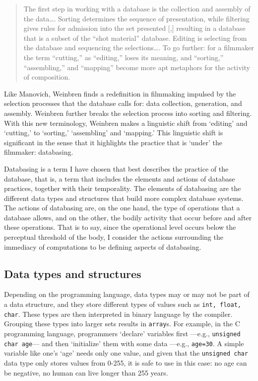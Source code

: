 \begin{quote}
	The first step in working with a database is the collection and assembly of the data\dots. Sorting determines the sequence of presentation, while filtering gives rules for admission into the set presented [,] resulting in a database that is a subset of the ``shot material'' database. Editing is selecting from the database and sequencing the selections\dots. To go further: for a filmmaker the term ``cutting,'' as ``editing,'' loses its meaning, and ``sorting,'' ``assembling,'' and ``mapping'' become more apt metaphors for the activity of composition. \parencite[71]{Wei07:Oce}
\end{quote}

Like Manovich, Weinbren finds a redefinition in filmmaking impulsed by the selection processes that the database calls for: data collection, generation, and assembly. Weinbren further breaks the selection process into sorting and filtering. With this new terminology, Weinbren makes a linguistic shift from `editing' and `cutting,' to `sorting,' `assembling' and `mapping.' This linguistic shift is significant in the sense that it highlights the practice that is `under' the filmmaker: databasing. 

Databasing is a term I have chosen that best describes the practice of the database, that is, a term that includes the elements and actions of database practices, together with their temporality. The elements of databasing are the different data types and structures that build more complex database systems. The actions of databasing are, on the one hand, the type of operations that a database allows, and on the other, the bodily activity that occur before and after these operations. That is to say, since the operational level occurs below the perceptual threshold of the body, I consider the actions surrounding the immediacy of computations to be defining aspects of databasing.

\subsection{Data types and structures}

Depending on the programming language, data types may or may not be part of a data structure, and they store different types of values such as \texttt{int, float, char}. These types are then interpreted in binary language by the compiler. Grouping these types into larger sets results in \texttt{array}s. For example, in the C programming language, programmers `declare' variables first ---e.g., \texttt{unsigned char age}--- and then `initialize' them with some data ---e.g., \texttt{age=30}. A simple variable like one's `age' needs only one value, and given that the \texttt{unsigned char} data type only stores values from 0-255, it is safe to use in this case: no age can be negative, no human can live longer than 255 years.

